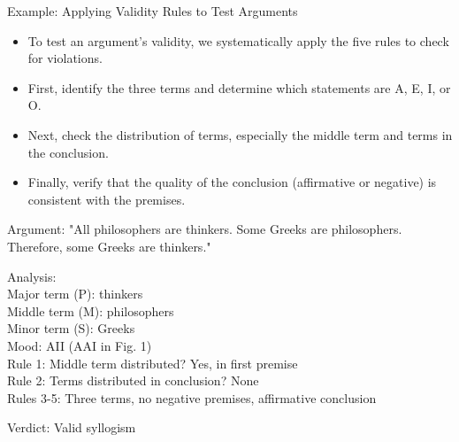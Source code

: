 \documentclass{beamer}
\begin{document}
	\begin{frame}{Example: Applying Validity Rules to Test Arguments}
		\begin{itemize}
			\item To test an argument's validity, we systematically apply the five rules to check for violations.
			\item First, identify the three terms and determine which statements are A, E, I, or O.
			\item Next, check the distribution of terms, especially the middle term and terms in the conclusion.
			\item Finally, verify that the quality of the conclusion (affirmative or negative) is consistent with the premises.
		\end{itemize}
		
		\begin{example}
			\scriptsize
			Argument: "All philosophers are thinkers. Some Greeks are philosophers. Therefore, some Greeks are thinkers."
			
			Analysis:\\
			Major term (P): thinkers\\
			Middle term (M): philosophers\\
			Minor term (S): Greeks\\
			
			Mood: AII (AAI in Fig. 1)\\
			Rule 1: Middle term distributed? Yes, in first premise\\
			Rule 2: Terms distributed in conclusion? None\\
			Rules 3-5: Three terms, no negative premises, affirmative conclusion 
			
			Verdict: Valid syllogism
		\end{example}
	\end{frame}
	
\end{document}
